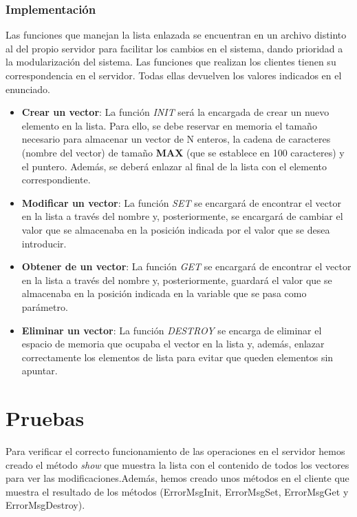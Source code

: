 \documentclass[10pt, spanish, pdftex]{template/UC3M_document}
\begin{document}
\subsubsection{Implementación}
Las funciones que manejan la lista enlazada se encuentran en un archivo distinto al del propio servidor para facilitar los cambios en el sistema, dando prioridad a la modularización del sistema. Las funciones que realizan los clientes tienen su correspondencia en el servidor. Todas ellas devuelven los valores indicados en el enunciado.
\begin{itemize}
    \item \textbf{Crear un vector}: La función \textit{INIT} será la encargada de crear un nuevo elemento en la lista. Para ello, se debe reservar en memoria el tamaño necesario para almacenar un vector de N enteros, la cadena de caracteres (nombre del vector) de tamaño \textbf{MAX} (que se establece en 100 caracteres) y el puntero. Además, se deberá enlazar al final de la lista con el elemento correspondiente.
    \item \textbf{Modificar un vector}: La función \textit{SET} se encargará de encontrar el vector en la lista a través del nombre y, posteriormente, se encargará de cambiar el valor que se almacenaba en la posición indicada por el valor que se desea introducir.
    \item \textbf{Obtener de un vector}: La función \textit{GET} se encargará de encontrar el vector en la lista a través del nombre y, posteriormente, guardará el valor que se almacenaba en la posición indicada en la variable que se pasa como parámetro.
    \item \textbf{Eliminar un vector}: La función \textit{DESTROY} se encarga de eliminar el espacio de memoria que ocupaba el vector en la lista y, además, enlazar correctamente los elementos de lista para evitar que queden elementos sin apuntar.
\end{itemize}

\section{Pruebas}
Para verificar el correcto funcionamiento de las operaciones en el servidor hemos creado el método \textit{show} que muestra la lista con el contenido de todos los vectores para ver las modificaciones.Además, hemos creado unos métodos en el cliente que muestra el resultado de los métodos (ErrorMsgInit, ErrorMsgSet, ErrorMsgGet y ErrorMsgDestroy).
\end{document}
